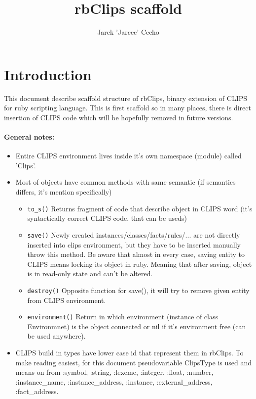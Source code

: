 \documentclass[a4paper,10pt]{article}
\title{rbClips scaffold}
\author{Jarek 'Jarcec' Cecho}
\begin{document}
\maketitle

\section{Introduction}
This document describe scaffold structure of rbClips, binary extension of CLIPS for ruby scripting language. This is first scaffold so in many places, there is direct insertion of CLIPS code which will be hopefully removed in future versions.

\paragraph{General notes:}
\begin{itemize}
 \item Entire CLIPS environment lives inside it's own namespace (module) called 'Clips'.
 \item Most of objects have common methods with same semantic (if semantics differs, it's mention specifically)
	\begin{itemize}
	 \item \texttt{to\_s()} Returns fragment of code that describe object in CLIPS word (it's syntactically correct CLIPS code, that can be useds)
	 \item \texttt{save()} Newly created instances/classes/facts/rules/... are not directly inserted into clips environment, but they have to be inserted manually throw this method. Be aware that almost in every case, saving entity to CLIPS means locking its object in ruby. Meaning that after saving, object is in read-only state and can't be altered.
	 \item \texttt{destroy()} Opposite function for save(), it will try to remove given entity from CLIPS environment.
	 \item \texttt{environment()} Return in which environment (instance of class Environmnet) is the object connected or nil if it's environment free (can be used anywhere).
	\end{itemize}
 \item CLIPS build in types have lower case id that represent them in rbClips. To make reading easiest, for this document pseudovariable ClipsType is used and means on from :symbol, :string, :lexeme, :integer, :float, :number, :instance\_name, :instance\_address, :instance, :external\_address, :fact\_address.
\end{itemize}
\end{document}
